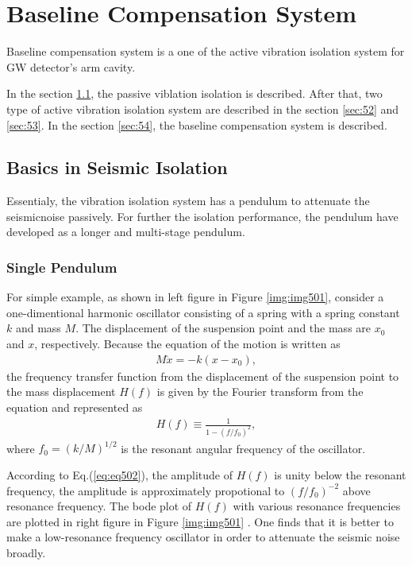 \chapter{Baseline Compensation System} \label{chap4}
Baseline compensation system is a one of the active vibration isolation system for GW detector's arm cavity. 

In the section \cref{sec:51}, the passive viblation isolation is described. After that, two type of active vibration isolation system are described in the section \cref{sec:52} and \cref{sec:53}. In the section \cref{sec:54}, the baseline compensation system is described.

\section{Basics in Seismic Isolation}\label{sec:51}
Essentialy, the vibration isolation system has a pendulum to attenuate the seismicnoise passively. For further the isolation performance, the pendulum have developed as a longer and multi-stage pendulum.

\subsection{Single Pendulum}
For simple example, as shown in left figure in Figure \ref{img:img501}, consider a one-dimentional harmonic oscillator consisting of a spring with a spring constant $k$ and mass $M$. The displacement of the suspension point and the mass are $x_0$ and $x$, respectively. Because the equation of the motion is written as
\begin{eqnarray} \label{eq:eq501}
  M\ddot{x} = -k(x-x_0),
\end{eqnarray}
the frequency transfer function from the displacement of the suspension point to the mass displacement $H(f)$ is given by the Fourier transform from the equation and represented as
\begin{eqnarray} \label{eq:eq502}
  H(f) \equiv \frac{1}{1-(f/f_0)^2},
\end{eqnarray}
where $f_0 = (k/M)^{1/2}$ is the resonant angular frequency of the oscillator.

According to Eq.(\ref{eq:eq502}), the amplitude of $H(f)$ is unity below the resonant frequency, the amplitude is approximately propotional to $(f/f_0)^{-2}$ above resonance frequency. The bode plot of $H(f)$ with various resonance frequencies are plotted in right figure in Figure \ref{img:img501} . One finds that it is better to make a low-resonance frequency oscillator in order to attenuate the seismic noise broadly. 

